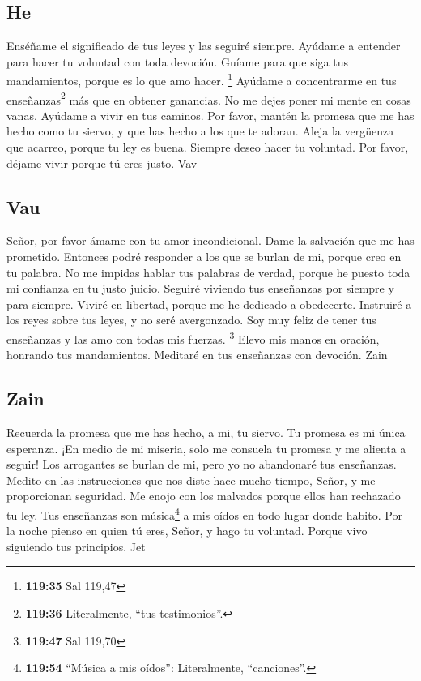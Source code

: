 \hypertarget{he}{%
\subsection{He}\label{he}}

 Enséñame el significado de tus leyes y las seguiré
siempre.  Ayúdame a entender para hacer tu voluntad con
toda devoción.  Guíame para que siga tus mandamientos,
porque es lo que amo hacer. \footnote{\textbf{119:35} Sal 119,47}
 Ayúdame a concentrarme en tus enseñanzas\footnote{\textbf{119:36}
  Literalmente, ``tus testimonios''.} más que en obtener ganancias.
 No me dejes poner mi mente en cosas vanas. Ayúdame a
vivir en tus caminos.  Por favor, mantén la promesa que
me has hecho como tu siervo, y que has hecho a los que te adoran.
 Aleja la vergüenza que acarreo, porque tu ley es buena.
 Siempre deseo hacer tu voluntad. Por favor, déjame vivir
porque tú eres justo. Vav

\hypertarget{vau}{%
\subsection{Vau}\label{vau}}

 Señor, por favor ámame con tu amor incondicional. Dame
la salvación que me has prometido.  Entonces podré
responder a los que se burlan de mi, porque creo en tu palabra.
 No me impidas hablar tus palabras de verdad, porque he
puesto toda mi confianza en tu justo juicio.  Seguiré
viviendo tus enseñanzas por siempre y para siempre. 
Viviré en libertad, porque me he dedicado a obedecerte. 
Instruiré a los reyes sobre tus leyes, y no seré avergonzado.
 Soy muy feliz de tener tus enseñanzas y las amo con
todas mis fuerzas. \footnote{\textbf{119:47} Sal 119,70} 
Elevo mis manos en oración, honrando tus mandamientos. Meditaré en tus
enseñanzas con devoción. Zain

\hypertarget{zain}{%
\subsection{Zain}\label{zain}}

 Recuerda la promesa que me has hecho, a mi, tu siervo.
Tu promesa es mi única esperanza.  ¡En medio de mi
miseria, solo me consuela tu promesa y me alienta a seguir!
 Los arrogantes se burlan de mi, pero yo no abandonaré
tus enseñanzas.  Medito en las instrucciones que nos
diste hace mucho tiempo, Señor, y me proporcionan seguridad.
 Me enojo con los malvados porque ellos han rechazado tu
ley.  Tus enseñanzas son música\footnote{\textbf{119:54}
  ``Música a mis oídos'': Literalmente, ``canciones''.} a mis oídos en
todo lugar donde habito.  Por la noche pienso en quien tú
eres, Señor, y hago tu voluntad.  Porque vivo siguiendo
tus principios. Jet


